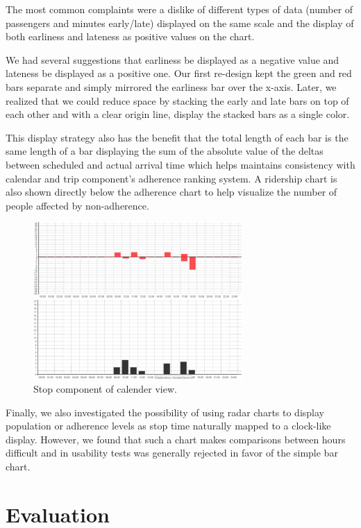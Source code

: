 \documentclass[journal]{vgtc}                %
\begin{document}
The most common complaints were a dislike of different types of data (number of passengers and minutes early/late) displayed on the same scale and the display of both earliness and lateness as positive values on the chart.

We had several suggestions that earliness be displayed as a negative value and lateness be displayed as a positive one. Our first re-design kept the green and red bars separate and simply mirrored the earliness bar over the x-axis. Later, we realized that we could reduce space by stacking the early and late bars on top of each other and with a clear origin line, display the stacked bars as a single color.

This display strategy also has the benefit that the total length of each bar is the same length of a bar displaying the sum of the absolute value of the deltas between scheduled and actual arrival time which helps maintains consistency with calendar and trip component's adherence ranking system. A ridership chart is also shown directly below the adherence chart to help visualize the number of people affected by non-adherence.

\begin{figure}[htb]
 \centering
 \includegraphics[width=8cm]{img/image05}
 \caption{Stop component of calender view.}
 \label{stop_component}
\end{figure}

Finally, we also investigated the possibility of using radar charts to display population or adherence levels as stop time naturally mapped to a clock-like display. However, we found that such a chart makes comparisons between hours difficult and in usability tests was generally rejected in favor of the simple bar chart.

\section{Evaluation}
\end{document}
